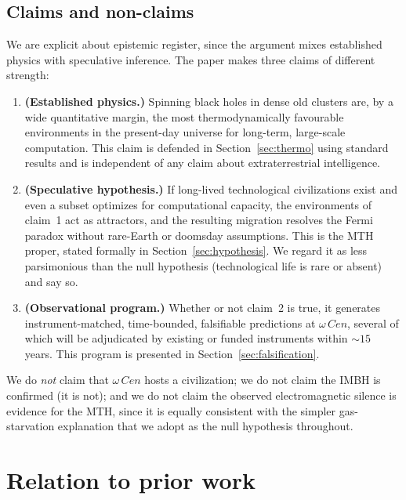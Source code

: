 \documentclass[11pt]{article}
\newcommand{\acen}{\ensuremath{\omega}\,Cen}
\begin{document}
\subsection{Claims and non-claims}
We are explicit about epistemic register, since the argument mixes established physics with speculative inference. The paper makes three claims of different strength:
\begin{enumerate}[leftmargin=1.4em]
\item \textbf{(Established physics.)} Spinning black holes in dense old clusters are, by a wide quantitative margin, the most thermodynamically favourable environments in the present-day universe for long-term, large-scale computation. This claim is defended in Section~\ref{sec:thermo} using standard results and is independent of any claim about extraterrestrial intelligence.
\item \textbf{(Speculative hypothesis.)} If long-lived technological civilizations exist and even a subset optimizes for computational capacity, the environments of claim~1 act as attractors, and the resulting migration resolves the Fermi paradox without rare-Earth or doomsday assumptions. This is the MTH proper, stated formally in Section~\ref{sec:hypothesis}. We regard it as less parsimonious than the null hypothesis (technological life is rare or absent) and say so.
\item \textbf{(Observational program.)} Whether or not claim~2 is true, it generates instrument-matched, time-bounded, falsifiable predictions at $\acen$, several of which will be adjudicated by existing or funded instruments within ${\sim}15$ years. This program is presented in Section~\ref{sec:falsification}.
\end{enumerate}
We do \emph{not} claim that $\acen$ hosts a civilization; we do not claim the IMBH is confirmed (it is not); and we do not claim the observed electromagnetic silence is evidence for the MTH, since it is equally consistent with the simpler gas-starvation explanation that we adopt as the null hypothesis throughout.

\section{Relation to prior work}\label{sec:related}
\end{document}
